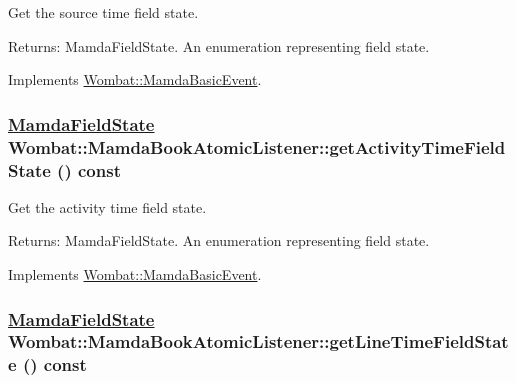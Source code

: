 Get the source time field state. 

\begin{Desc}
\item[Returns:]Mamda\-Field\-State. An enumeration representing field state. \end{Desc}


Implements \hyperlink{classWombat_1_1MamdaBasicEvent_9cd58f3d7b5ebea42fa86e5dde46ab18}{Wombat::Mamda\-Basic\-Event}.\hypertarget{classWombat_1_1MamdaBookAtomicListener_9910ae16b92a548bce1821ed98de8956}{
\subsubsection[getActivityTimeFieldState]{\setlength{\rightskip}{0pt plus 5cm}\hyperlink{namespaceWombat_93aac974f2ab713554fd12a1fa3b7d2a}{Mamda\-Field\-State} Wombat::Mamda\-Book\-Atomic\-Listener::get\-Activity\-Time\-Field\-State () const}}
\label{classWombat_1_1MamdaBookAtomicListener_9910ae16b92a548bce1821ed98de8956}


Get the activity time field state. 

\begin{Desc}
\item[Returns:]Mamda\-Field\-State. An enumeration representing field state. \end{Desc}


Implements \hyperlink{classWombat_1_1MamdaBasicEvent_a61a566e3442181ca1fadc4524296cd0}{Wombat::Mamda\-Basic\-Event}.\hypertarget{classWombat_1_1MamdaBookAtomicListener_74f25a0ce9a9b71b44d482017457e260}{
\subsubsection[getLineTimeFieldState]{\setlength{\rightskip}{0pt plus 5cm}\hyperlink{namespaceWombat_93aac974f2ab713554fd12a1fa3b7d2a}{Mamda\-Field\-State} Wombat::Mamda\-Book\-Atomic\-Listener::get\-Line\-Time\-Field\-State () const}}
\label{classWombat_1_1MamdaBookAtomicListener_74f25a0ce9a9b71b44d482017457e260}


